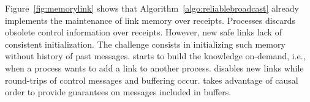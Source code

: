 

Figure~\ref{fig:memorylink} shows that Algorithm~\ref{algo:reliablebroadcast}
already implements the maintenance of link memory over receipts. Processes
discards obsolete control information over receipts.  However, new safe links
lack of consistent initialization. The challenge consists in initializing such
memory without history of past messages. \RPCBROADCAST starts to build the
knowledge on-demand, i.e., when a process wants to add a link to another
process. \RPCBROADCAST disables new links while round-trips of control messages
and buffering occur.  \RPCBROADCAST takes advantage of causal order to provide
guarantees on messages included in buffers.




